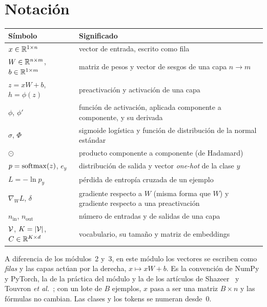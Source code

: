 \documentclass[11pt,a4paper,twoside,openany]{book}
\newcommand{\nin}{n_{\mathrm{in}}}
\newcommand{\nout}{n_{\mathrm{out}}}
\begin{document}
\section*{Notación}
\begin{center}\small
\begin{tabularx}{\textwidth}{@{}l>{\raggedright\arraybackslash}X@{}}
\toprule
Símbolo & Significado \\
\midrule
$x\in\mathbb{R}^{1\times n}$ & vector de entrada, escrito como fila \\
$W\in\mathbb{R}^{n\times m}$, $b\in\mathbb{R}^{1\times m}$ & matriz de pesos y vector de sesgos de una capa $n\to m$ \\
$z=xW+b$, $h=\phi(z)$ & preactivación y activación de una capa \\
$\phi$, $\phi'$ & función de activación, aplicada componente a componente, y su derivada \\
$\sigma$, $\Phi$ & sigmoide logística y función de distribución de la normal estándar \\
$\odot$ & producto componente a componente (de Hadamard) \\
$p=\operatorname{softmax}(z)$, $e_y$ & distribución de salida y vector \emph{one-hot} de la clase $y$ \\
$L=-\ln p_y$ & pérdida de entropía cruzada de un ejemplo \\
$\nabla_{\!W}L$, $\delta$ & gradiente respecto a $W$ (misma forma que $W$) y gradiente respecto a una preactivación \\
$\nin$, $\nout$ & número de entradas y de salidas de una capa \\
$\mathcal{V}$, $K=\lvert\mathcal{V}\rvert$, $C\in\mathbb{R}^{K\times d}$ & vocabulario, su tamaño y matriz de embeddings \\
\bottomrule
\end{tabularx}
\end{center}

A diferencia de los módulos~2 y~3, en este módulo los vectores se escriben como \emph{filas} y las capas actúan por la derecha, $x\mapsto xW+b$. Es la convención de NumPy y PyTorch, la de la práctica del módulo y la de los artículos de Shazeer~\cite{shazeer} y Touvron \emph{et al.}~\cite{touvron}; con un lote de $B$ ejemplos, $x$ pasa a ser una matriz $B\times n$ y las fórmulas no cambian. Las clases y los tokens se numeran desde~0.

\tableofcontents

\mainmatter







\appendix


\backmatter

\end{document}
